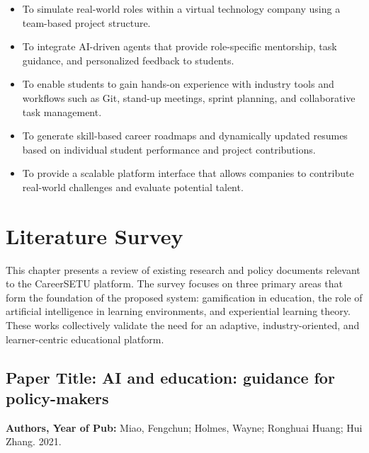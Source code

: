 \documentclass[12pt,a4paper]{report}
\begin{document}
\begin{itemize}
    \item To simulate real-world roles within a virtual technology company using a
    team-based project structure.
    \item To integrate AI-driven agents that provide role-specific mentorship, task
    guidance, and personalized feedback to students.
    \item To enable students to gain hands-on experience with industry tools and
    workflows such as Git, stand-up meetings, sprint planning, and collaborative task
    management.
    \item To generate skill-based career roadmaps and dynamically updated resumes
    based on individual student performance and project contributions.
    \item To provide a scalable platform interface that allows companies to contribute
    real-world challenges and evaluate potential talent.
\end{itemize}

\chapter{Literature Survey}

This chapter presents a review of existing research and policy documents relevant to the
CareerSETU platform. The survey focuses on three primary areas that form the foundation
of the proposed system: gamification in education, the role of artificial intelligence in
learning environments, and experiential learning theory. These works collectively validate
the need for an adaptive, industry-oriented, and learner-centric educational platform.


\section{Paper Title: AI and education: guidance for policy-makers}
\textbf{Authors, Year of Pub:} Miao, Fengchun; Holmes, Wayne; Ronghuai Huang; Hui Zhang. 2021.
\end{document}
